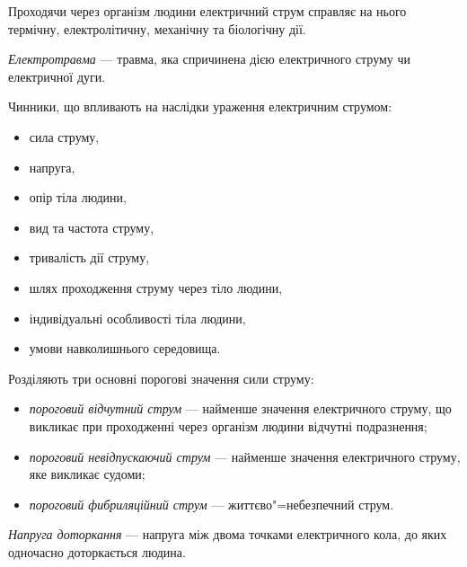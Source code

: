 \documentclass[a4paper,10pt,notitlepage,pdftex,headsepline]{scrartcl}
\begin{document}
  Проходячи через організм людини електричний струм справляє на нього
  термічну, електролітичну, механічну та біологічну дії.

  \emph{Електротравма} --- травма, яка спричинена дією електричного струму чи
  електричної дуги.

  Чинники, що впливають на наслідки ураження електричним струмом:
  \begin{itemize}
    \item сила струму,
    \item напруга,
    \item опір тіла людини,
    \item вид та частота струму,
    \item тривалість дії струму,
    \item шлях проходження струму через тіло людини,
    \item індивідуальні особливості тіла людини,
    \item умови навколишнього середовища.
  \end{itemize}

  Розділяють три основні порогові значення сили струму:
  \begin{itemize}
    \item \emph{пороговий відчутний струм} --- найменше значення електричного
      струму, що викликає при проходженні через організм людини відчутні
      подразнення;
    \item \emph{пороговий невідпускаючий струм} --- найменше значення
      електричного струму, яке викликає судоми;
    \item \emph{пороговий фибриляційний струм} --- життєво"=небезпечний струм.
  \end{itemize}

  \emph{Напруга доторкання} --- напруга між двома точками електричного кола,
  до яких одночасно доторкається людина.
\end{document}

